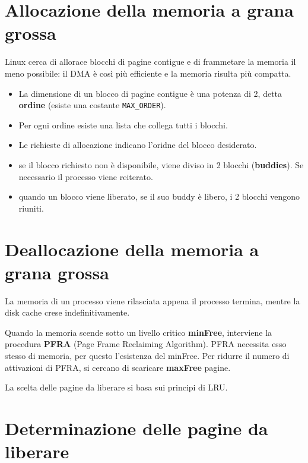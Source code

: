 \documentclass[12pt, a4paper]{report}
\begin{document}
\section{Allocazione della memoria a grana grossa}
Linux cerca di allorace blocchi di pagine contigue e di frammetare la memoria il
meno possibile: il DMA è così più efficiente e la memoria risulta più compatta.

\begin{itemize}
	\item La dimensione di un blocco di pagine contigue è una potenza di 2,
		detta \textbf{ordine} (esiste una costante \texttt{MAX\_ORDER}).
	\item Per ogni ordine esiste una lista che collega tutti i blocchi.
	\item Le richieste di allocazione indicano l'oridne del blocco desiderato.
	\item se il blocco richiesto non è disponibile, viene diviso in 2 blocchi
		(\textbf{buddies}). Se necessario il processo viene reiterato.
	\item quando un blocco viene liberato, se il suo buddy è libero, i 2
		blocchi vengono riuniti.
\end{itemize}

\section{Deallocazione della memoria a grana grossa}
La memoria di un processo viene rilasciata appena il processo termina, mentre la
disk cache crese indefinitivamente.

Quando la memoria scende sotto un livello critico \textbf{minFree}, interviene
la procedura \textbf{PFRA} (Page Frame Reclaiming Algorithm). PFRA necessita
esso stesso di memoria, per questo l'esistenza del minFree. Per ridurre il
numero di attivazioni di PFRA, si cercano di scaricare \textbf{maxFree} pagine.

La scelta delle pagine da liberare si basa sui principi di LRU.

\section{Determinazione delle pagine da liberare}
\end{document}
